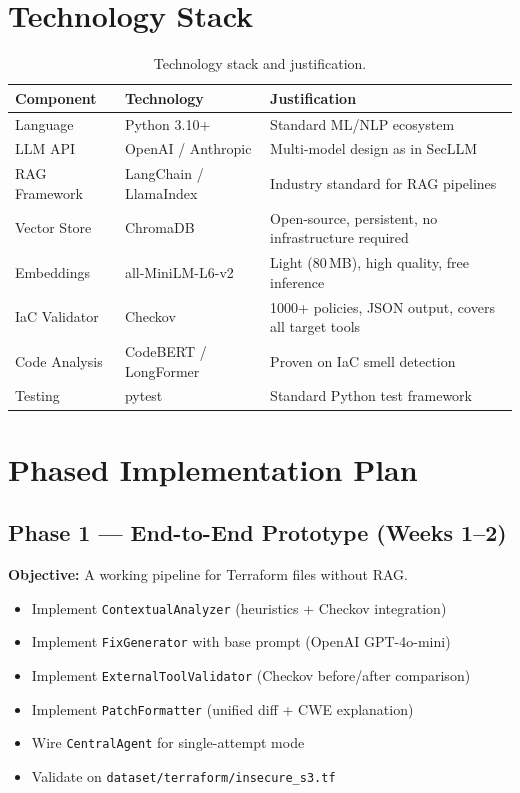 \documentclass[12pt, a4paper]{report}
\begin{document}
\section{Technology Stack}

\begin{table}[H]
  \centering
  \caption{Technology stack and justification.}
  \label{tab:tech}
  \begin{tabularx}{\linewidth}{llX}
    \toprule
    \textbf{Component} & \textbf{Technology} & \textbf{Justification} \\
    \midrule
    Language & Python 3.10+ & Standard ML/NLP ecosystem \\
    LLM API & OpenAI / Anthropic & Multi-model design as in SecLLM~\citep{devito2025secllm} \\
    RAG Framework & LangChain / LlamaIndex & Industry standard for RAG pipelines \\
    Vector Store & ChromaDB & Open-source, persistent, no infrastructure required \\
    Embeddings & all-MiniLM-L6-v2 & Light (80\,MB), high quality, free inference \\
    IaC Validator & Checkov & 1000+ policies, JSON output, covers all target tools \\
    Code Analysis & CodeBERT / LongFormer & Proven on IaC smell detection~\citep{war2025detection} \\
    Testing & pytest & Standard Python test framework \\
    \bottomrule
  \end{tabularx}
\end{table}

\section{Phased Implementation Plan}

\subsection{Phase 1 --- End-to-End Prototype (Weeks 1--2)}

\textbf{Objective:} A working pipeline for Terraform files without RAG.

\begin{itemize}
  \item Implement \texttt{ContextualAnalyzer} (heuristics + Checkov integration)
  \item Implement \texttt{FixGenerator} with base prompt (OpenAI GPT-4o-mini)
  \item Implement \texttt{ExternalToolValidator} (Checkov before/after comparison)
  \item Implement \texttt{PatchFormatter} (unified diff + CWE explanation)
  \item Wire \texttt{CentralAgent} for single-attempt mode
  \item Validate on \texttt{dataset/terraform/insecure\_s3.tf}
\end{itemize}
\end{document}
